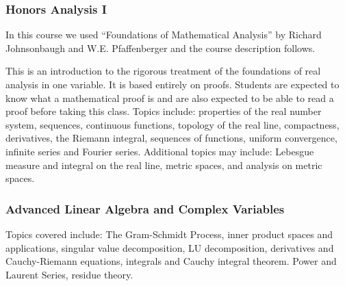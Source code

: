 \documentclass[11pt]{article}
\begin{document}
\subsubsection*{Honors Analysis I}
In this course we used ``Foundations of Mathematical Analysis'' by Richard Johnsonbaugh and W.E. Pfaffenberger and the course description follows.
\begin{displayquote}
This is an introduction to the rigorous treatment of the foundations of real analysis in one variable. It is based entirely on proofs. Students are expected to know what a mathematical proof is and are also expected to be able to read a proof before taking this class. Topics include: properties of the real number system, sequences, continuous functions, topology of the real line, compactness, derivatives, the Riemann integral, sequences of functions, uniform convergence, infinite series and Fourier series. Additional topics may include: Lebesgue measure and integral on the real line, metric spaces, and analysis on metric spaces.
\end{displayquote}

\subsubsection*{Advanced Linear Algebra and Complex Variables}
\begin{displayquote}
Topics covered include: The Gram-Schmidt Process, inner product spaces and applications, singular value decomposition, LU decomposition, derivatives and Cauchy-Riemann equations, integrals and Cauchy integral theorem. Power and Laurent Series, residue theory. 
\end{displayquote}
\end{document}
